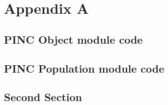 \chapter{Appendix A}
\label{sec:appendixA}
\section{PINC Object module code}
\label{sec:ObjectCode}

\kant[20-21] %
\section{PINC Population module code}
\kant[22]    %
\section{Second Section}
\kant[23-24] %